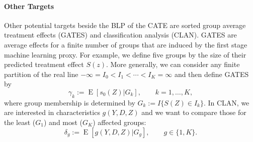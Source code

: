 \documentclass[11pt, a4paper, leqno]{article}
\DeclareMathOperator{\E}{E}
\begin{document}
\paragraph*{Other Targets}
Other potential targets beside the BLP of the CATE are sorted group average treatment effects (GATES) and classification analysis (CLAN).
GATES are average effects for a finite number of groups that are induced by the first stage machine learning proxy.
For example, we define five groups by the size of their predicted treatment effect $S(z)$.
More generally, we can consider any finite partition of the real line $-\infty = I_0 < I_1 < \cdots < I_K = \infty$ and then define GATES by
\begin{equation*}
    \gamma_k := \E[s_0(Z)|G_k], \qquad k=1,\ldots,K,
\end{equation*}
where group membership is determined by $G_k := I\{S(Z) \in I_k\}$.
In CLAN, we are interested in characteristics $g(Y, D, Z)$ and we want to compare those for the least ($G_1$) and most ($G_K$) affected groups:
\begin{equation*}
    \delta_g := \E[g(Y, D, Z)|G_g], \qquad g \in \{1, K\}.
\end{equation*}

\end{document}
